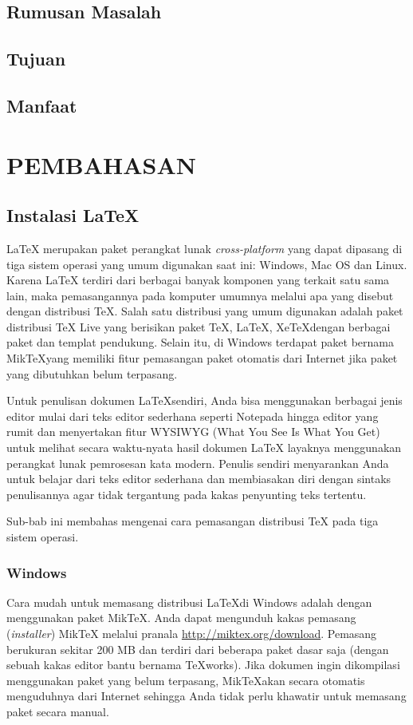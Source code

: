 \documentclass{ta-its}
\begin{document}
        \section{Rumusan Masalah}
        \section{Tujuan}
        \section{Manfaat}
    
    \chapter{PEMBAHASAN}
        \section{Instalasi \LaTeX{}}
        \LaTeX{} merupakan paket perangkat lunak \emph{cross-platform} yang dapat dipasang di tiga sistem operasi yang umum digunakan saat ini: Windows, Mac OS dan Linux. Karena \LaTeX{} terdiri dari berbagai banyak komponen yang terkait satu sama lain, maka pemasangannya pada komputer umumnya melalui apa yang disebut dengan distribusi \TeX{}. Salah satu distribusi yang umum digunakan adalah paket distribusi \TeX{} Live yang berisikan paket \TeX, \LaTeX, Xe\TeX dengan berbagai paket dan templat pendukung. Selain itu, di Windows terdapat paket bernama Mik\TeX yang memiliki fitur pemasangan paket otomatis dari Internet jika paket yang dibutuhkan belum terpasang.

        Untuk penulisan dokumen \LaTeX sendiri, Anda bisa menggunakan berbagai jenis editor mulai dari teks editor sederhana seperti Notepada hingga editor yang rumit dan menyertakan fitur WYSIWYG (What You See Is What You Get) untuk melihat secara waktu-nyata hasil dokumen \LaTeX{} layaknya menggunakan perangkat lunak pemrosesan kata modern. Penulis sendiri menyarankan Anda untuk belajar dari teks editor sederhana dan membiasakan diri dengan sintaks penulisannya agar tidak tergantung pada kakas penyunting teks tertentu.

        Sub-bab ini membahas mengenai cara pemasangan distribusi \TeX{} pada tiga sistem operasi. 

        \subsection{Windows}
        Cara mudah untuk memasang distribusi \LaTeX di Windows adalah dengan menggunakan paket Mik\TeX{}. Anda dapat mengunduh kakas pemasang (\emph{installer}) Mik\TeX{} melalui pranala \url{http://miktex.org/download}.  Pemasang berukuran sekitar 200 MB dan terdiri dari beberapa paket dasar saja (dengan sebuah kakas editor bantu bernama \TeX{}works). Jika dokumen ingin dikompilasi menggunakan paket yang belum terpasang, Mik\TeX akan secara otomatis menguduhnya dari Internet sehingga Anda tidak perlu khawatir untuk memasang paket secara manual.
        
\end{document}
